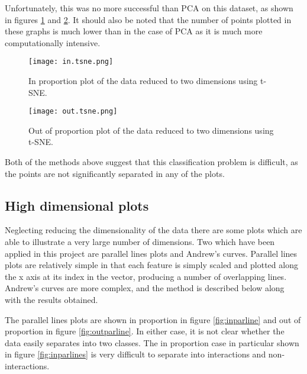 Unfortunately, this was no more successful than PCA on this dataset, as shown in figures \ref{fig:intsne} and \ref{fig:outtsne}.
It should also be noted that the number of points plotted in these graphs is much lower than in the case of PCA as it is much more computationally intensive.

\begin{figure}
    \texttt{[image: in.tsne.png]}
    \centering
    \caption{In proportion plot of the data reduced to two dimensions using t-SNE.}
    \label{fig:intsne}
\end{figure}

\begin{figure}
    \texttt{[image: out.tsne.png]}
    \centering
    \caption{Out of proportion plot of the data reduced to two dimensions using t-SNE.}
    \label{fig:outtsne}
\end{figure}

Both of the methods above suggest that this classification problem is difficult, as the points are not significantly separated in any of the plots.

\subsection{High dimensional plots}

Neglecting reducing the dimensionality of the data there are some plots which are able to illustrate a very large number of dimensions.
Two which have been applied in this project are parallel lines plots and Andrew's curves\autocite{andrews_plots_1972}.
Parallel lines plots are relatively simple in that each feature is simply scaled and plotted along the x axis at its index in the vector, producing a number of overlapping lines.
Andrew's curves are more complex, and the method is described below along with the results obtained.

The parallel lines plots are shown in proportion in figure \ref{fig:inparline} and out of proportion in figure \ref{fig:outparline}.
In either case, it is not clear whether the data easily separates into two classes.
The in proportion case in particular shown in figure \ref{fig:inparlines} is very difficult to separate into interactions and non-interactions.

